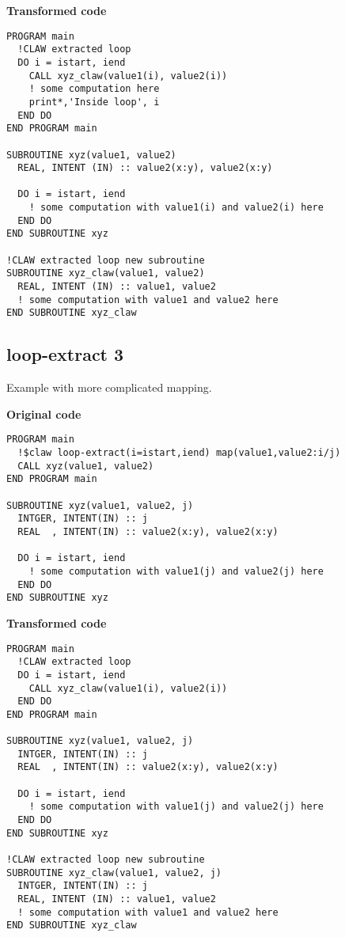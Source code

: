 \textbf{Transformed code}
\begin{lstlisting}
PROGRAM main
  !CLAW extracted loop
  DO i = istart, iend
    CALL xyz_claw(value1(i), value2(i))
    ! some computation here
    print*,'Inside loop', i
  END DO
END PROGRAM main

SUBROUTINE xyz(value1, value2)
  REAL, INTENT (IN) :: value2(x:y), value2(x:y)

  DO i = istart, iend
    ! some computation with value1(i) and value2(i) here
  END DO
END SUBROUTINE xyz

!CLAW extracted loop new subroutine
SUBROUTINE xyz_claw(value1, value2)
  REAL, INTENT (IN) :: value1, value2
  ! some computation with value1 and value2 here
END SUBROUTINE xyz_claw
\end{lstlisting}


\subsection{loop-extract 3}
\label{loop-extract3}
Example with more complicated mapping. 

\textbf{Original code}
\begin{lstlisting}
PROGRAM main
  !$claw loop-extract(i=istart,iend) map(value1,value2:i/j)
  CALL xyz(value1, value2)
END PROGRAM main

SUBROUTINE xyz(value1, value2, j)
  INTGER, INTENT(IN) :: j
  REAL  , INTENT(IN) :: value2(x:y), value2(x:y)

  DO i = istart, iend
    ! some computation with value1(j) and value2(j) here
  END DO
END SUBROUTINE xyz
\end{lstlisting}

\textbf{Transformed code}
\begin{lstlisting}
PROGRAM main
  !CLAW extracted loop
  DO i = istart, iend
    CALL xyz_claw(value1(i), value2(i))
  END DO
END PROGRAM main

SUBROUTINE xyz(value1, value2, j)
  INTGER, INTENT(IN) :: j
  REAL  , INTENT(IN) :: value2(x:y), value2(x:y)

  DO i = istart, iend
    ! some computation with value1(j) and value2(j) here
  END DO
END SUBROUTINE xyz

!CLAW extracted loop new subroutine
SUBROUTINE xyz_claw(value1, value2, j)
  INTGER, INTENT(IN) :: j
  REAL, INTENT (IN) :: value1, value2
  ! some computation with value1 and value2 here
END SUBROUTINE xyz_claw
\end{lstlisting}

